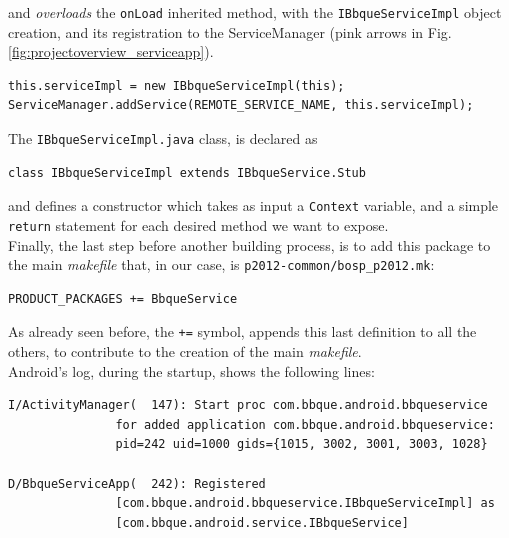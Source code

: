 and \textit{overloads} the \texttt{onLoad} inherited method, with the \texttt{IBbqueServiceImpl} object creation, and its registration to the ServiceManager (pink arrows in Fig.\ref{fig:projectoverview_serviceapp}).
\begin{verbatim}
this.serviceImpl = new IBbqueServiceImpl(this);
ServiceManager.addService(REMOTE_SERVICE_NAME, this.serviceImpl);
\end{verbatim}
The \texttt{IBbqueServiceImpl.java} class, is declared as
\begin{verbatim}
class IBbqueServiceImpl extends IBbqueService.Stub
\end{verbatim}
and defines a constructor which takes as input a \texttt{Context} variable, and a simple \texttt{return} statement for each desired method we want to expose.\\
Finally, the last step before another building process, is to add this package to the main \textit{makefile} that, in our case, is \texttt{p2012-common/bosp\_p2012.mk}:
\begin{verbatim}
PRODUCT_PACKAGES += BbqueService
\end{verbatim}
As already seen before, the \texttt{+=} symbol, appends this last definition to all the others, to contribute to the creation of the main \textit{makefile}.\\
Android's log, during the startup, shows the following lines:
\begin{verbatim}
I/ActivityManager(  147): Start proc com.bbque.android.bbqueservice
               for added application com.bbque.android.bbqueservice:
               pid=242 uid=1000 gids={1015, 3002, 3001, 3003, 1028}
               
D/BbqueServiceApp(  242): Registered 
               [com.bbque.android.bbqueservice.IBbqueServiceImpl] as
               [com.bbque.android.service.IBbqueService]
\end{verbatim}
